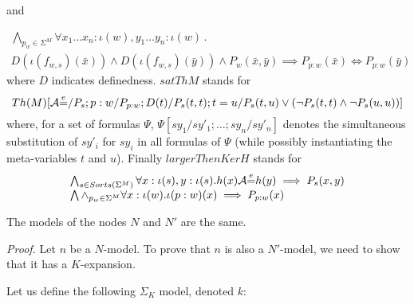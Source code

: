 \begin{itemize}
and

$$
\begin{array}{l}
\bigwedge_{p_w \in\Sigma^M} \forall x_1\ldots x_n:{\iota(w)},y_1\ldots y_n:{\iota(w)}\,.\,\,\\
D(\iota(f_{w,s})(\bar{x}))\land D(\iota(f_{w,s})(\bar{y}))\land P_w(\bar{x},\bar{y})
\implies P_{p:w}(\bar{x}) \Leftrightarrow P_{p:w}(\bar{y})
\end{array}
$$
\noindent where $D$ indicates definedness. $\mathit{satThM}$ stands for
$$Th(M)[\mathcal{A}{\stackrel{e}{=}}/P_s; p:w/P_{p:w}; D(t)/P_s(t,t); t=u/P_s(t,u)\lor(\neg P_s(t,t)\land\neg P_s(u,u))]$$
where, for a set of formulas $\Psi$, $\Psi[sy_1/sy'_1;\ldots ;sy_n/sy'_n]$
denotes the simultaneous substitution of $sy'_i$ for $sy_i$ in
all formulas of $\Psi$ (while possibly instantiating the meta-variables
$t$ and $u$).
%
Finally $\mathit{largerThenKerH}$ stands for
$$\begin{array}{l}
\bigwedge_{s\in Sorts(\Sigma^M)} \forall x:{\iota(s)},y:{\iota(s)}.h(x)\mathcal{A}{\stackrel{e}{=}} h(y)\implies P_s(x, y)\\
\bigwedge \land_{p_w\in\Sigma^M} \forall \relax{x}:{\iota(w)}.\iota(p:w)(\relax{x})
\implies P_{p:w}(\relax{x})
\end{array}
$$


\end{itemize}

\begin{proposition}

The models of the nodes $N$ and $N'$ are
the same.

\end{proposition}%

{\noindent\it Proof.}
%
Let $n$ be a $N$-model. To prove that $n$ is also a $N'$-model,
we need to show that it has a $K$-expansion.

Let us define the following $\Sigma_K$ model, denoted $k$:

